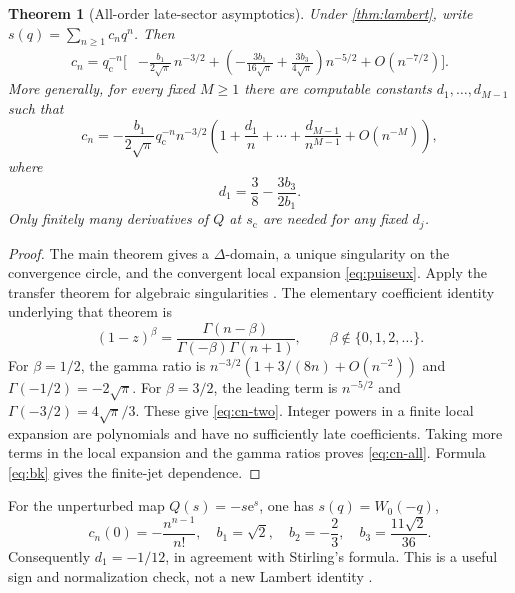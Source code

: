 \documentclass[11pt,a4paper]{article}
\numberwithin{equation}{section}
\newtheorem{theorem}{Theorem}[section]
\theoremstyle{definition}
\theoremstyle{remark}
\newcommand{\e}{\mathrm e}
\newcommand{\scv}{s_{\mathrm c}}
\newcommand{\qcv}{q_{\mathrm c}}
\begin{document}
\begin{theorem}[All-order late-sector asymptotics]
\label{thm:late}
Under \cref{thm:lambert}, write $s(q)=\sum_{n\geq1}c_nq^n$. Then
\begin{align}
 c_n=\qcv^{-n}\bigg[&-\frac{b_1}{2\sqrt\pi}\,n^{-3/2}
 +\left(-\frac{3b_1}{16\sqrt\pi}
           +\frac{3b_3}{4\sqrt\pi}\right)n^{-5/2}
 +O(n^{-7/2})\bigg].
 \label{eq:cn-two}
\end{align}
More generally, for every fixed $M\geq1$ there are computable constants $d_1,\ldots,d_{M-1}$ such that
\begin{equation}
 c_n=-\frac{b_1}{2\sqrt\pi}\qcv^{-n}n^{-3/2}
 \left(1+\frac{d_1}{n}+\cdots+
       \frac{d_{M-1}}{n^{M-1}}+O(n^{-M})\right),
 \label{eq:cn-all}
\end{equation}
where
\begin{equation}
 d_1=\frac38-\frac{3b_3}{2b_1}.
 \label{eq:d1}
\end{equation}
Only finitely many derivatives of $Q$ at $\scv$ are needed for any fixed $d_j$.
\end{theorem}
\begin{proof}
The main theorem gives a $\Delta$-domain, a unique singularity on the convergence circle, and the convergent local expansion \eqref{eq:puiseux}. Apply the transfer theorem for algebraic singularities \cite[Chapter VI]{fs}. The elementary coefficient identity underlying that theorem is
\begin{equation}
 [z^n](1-z)^\beta=
 \frac{\Gamma(n-\beta)}{\Gamma(-\beta)\Gamma(n+1)},
 \qquad \beta\notin\{0,1,2,\ldots\}.
 \label{eq:transfer-gamma}
\end{equation}
For $\beta=1/2$, the gamma ratio is
$n^{-3/2}(1+3/(8n)+O(n^{-2}))$ and $\Gamma(-1/2)=-2\sqrt\pi$. For $\beta=3/2$, the leading term is $n^{-5/2}$ and $\Gamma(-3/2)=4\sqrt\pi/3$. These give \eqref{eq:cn-two}. Integer powers in a finite local expansion are polynomials and have no sufficiently late coefficients. Taking more terms in the local expansion and the gamma ratios proves \eqref{eq:cn-all}. Formula \eqref{eq:bk} gives the finite-jet dependence.
\end{proof}

For the unperturbed map $Q(s)=-s\e^s$, one has $s(q)=W_0(-q)$,
\[
 c_n(0)=-\frac{n^{n-1}}{n!},\quad
 b_1=\sqrt2,\quad b_2=-\frac23,\quad
 b_3=\frac{11\sqrt2}{36}.
\]
Consequently $d_1=-1/12$, in agreement with Stirling's formula. This is a useful sign and normalization check, not a new Lambert identity \cite{dlmf}.
\end{document}

